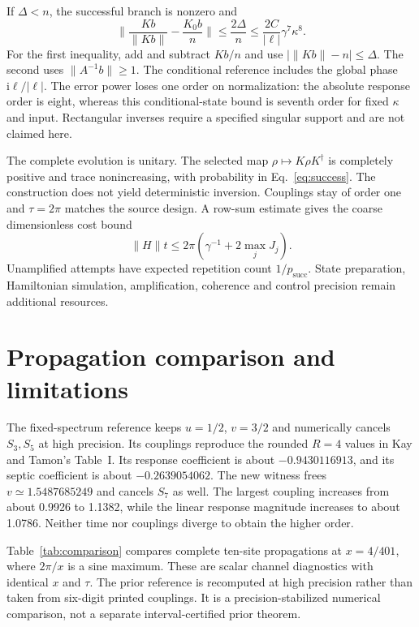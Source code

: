 \documentclass[11pt,a4paper]{article}
\newcommand{\ii}{\mathrm{i}}
\newcommand{\norm}[1]{\lVert #1\rVert}
\numberwithin{equation}{section}
\begin{document}
If $\Delta<n$, the successful branch is nonzero and
\begin{equation}
 \norm{\frac{Kb}{\norm{Kb}}-\frac{K_0b}{n}}
 \le\frac{2\Delta}{n}
 \le\frac{2C}{|\ell|}\gamma^7\kappa^8.
 \label{eq:conditional}
\end{equation}
For the first inequality, add and subtract $Kb/n$ and use
$|\norm{Kb}-n|\le\Delta$. The second uses
$\norm{A^{-1}b}\ge1$. The conditional reference includes the global
phase $\ii\ell/|\ell|$. The error power loses one order on normalization:
the absolute response order is eight, whereas this conditional-state bound
is seventh order for fixed $\kappa$ and input. Rectangular inverses require
a specified singular support and are not claimed here.

The complete evolution is unitary. The selected map
$\rho\mapsto K\rho K^\dagger$ is completely positive and trace
nonincreasing, with probability in Eq.~\eqref{eq:success}. The construction
does not yield deterministic inversion. Couplings stay of order one and
$\tau=2\pi$ matches the source design. A row-sum estimate gives the coarse
dimensionless cost bound
\begin{equation}
 \norm{H}t\le2\pi\left(\gamma^{-1}+2\max_jJ_j\right).
 \label{eq:cost}
\end{equation}
Unamplified attempts have expected repetition count $1/p_{\mathrm{succ}}$.
State preparation, Hamiltonian simulation, amplification, coherence and
control precision remain additional resources.

\section{Propagation comparison and limitations}
The fixed-spectrum reference keeps $u=1/2$, $v=3/2$ and numerically
cancels $S_3,S_5$ at high precision. Its couplings reproduce the rounded
$R=4$ values in Kay and Tamon's Table~I. Its response coefficient is about
$-0.9430116913$, and its septic coefficient is about $-0.2639054062$.
The new witness frees $v\simeq1.5487685249$ and cancels $S_7$ as well.
The largest coupling increases from about 0.9926 to 1.1382, while the
linear response magnitude increases to about 1.0786. Neither time nor
couplings diverge to obtain the higher order.

Table~\ref{tab:comparison} compares complete ten-site propagations at
$x=4/401$, where $2\pi/x$ is a sine maximum. These are scalar channel
diagnostics with identical $x$ and $\tau$. The prior reference is recomputed
at high precision rather than taken from six-digit printed couplings.
It is a precision-stabilized numerical comparison, not a separate
interval-certified prior theorem.

\end{document}
